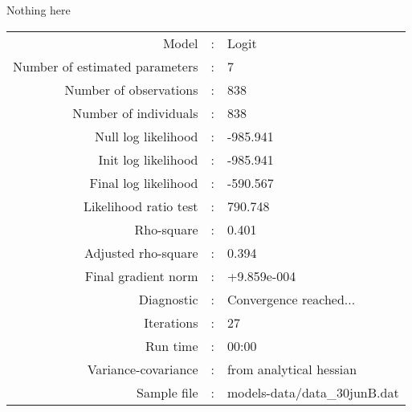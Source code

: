 Nothing here\\


\begin{flushleft}
\begin{tabular}{rcl}
\hline
Model &:& Logit\\
Number of estimated parameters&:&7\\
Number of  observations &:& 838\\
Number of individuals&:&838\\
Null log likelihood&:&-985.941\\
Init log likelihood&:&-985.941\\
Final log likelihood&:&-590.567\\
Likelihood ratio test &:&790.748\\
Rho-square&:&0.401\\
Adjusted rho-square&:&0.394\\
Final gradient norm&:&+9.859e-004\\
Diagnostic&:&Convergence reached...\\
Iterations&:&27\\
Run time&:&00:00\\
Variance-covariance&:&from analytical hessian
\\
Sample file&:&models-data/data_30junB.dat\\
\end{tabular}
\end{flushleft}
